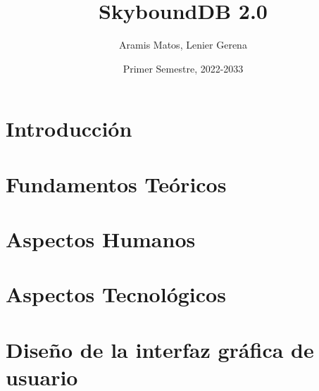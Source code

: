 \documentclass{report}
\title{SkyboundDB 2.0}
\author{Aramis Matos, Lenier Gerena}
\date{Primer Semestre, 2022-2033}
\begin{document}
\renewcommand{\acronymname}{Acrónimos}
\renewcommand{\bibname}{Referencias Bibliográficas}
\renewcommand{\contentsname}{Tabla de Contenido}
\renewcommand{\chaptername}{Capítulo}
\renewcommand{\figurename}{Figura}
\renewcommand{\tablename}{Tabla}

\maketitle

\tableofcontents

\chapter{Introducción}



\chapter{Fundamentos Teóricos}



\chapter{Aspectos Humanos}



\chapter{Aspectos Tecnológicos}



\chapter{Diseño de la interfaz gráfica de usuario}



\printglossary[type=\acronymtype]




\end{document}

